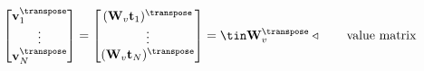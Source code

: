 \begin{align}
    \begin{bmatrix}
        \mathbf{v}_1^\transpose \\
        \vdots                  \\
        \mathbf{v}_N^\transpose \\
    \end{bmatrix}
    =
    \begin{bmatrix}
        (\mathbf{W}_v \mathbf{t}_1)^\transpose \\
        \vdots                                 \\
        (\mathbf{W}_v \mathbf{t}_N)^\transpose \\
    \end{bmatrix}
    = \tin\mathbf{W}_v^\transpose & \triangleleft \quad\quad \text{value matrix}
\end{align}

